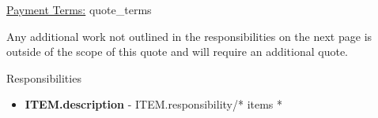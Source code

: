\documentclass{letter}
\begin{document}
\vspace{3 cm}

\underline{Payment Terms:} {{ quote_terms }}

\vspace{0.5 cm}

\small{Any additional work not outlined in the responsibilities on the next page is outside of the scope of this quote and will require an additional quote.}

\newpage

\Large{Responsibilities}

\begin{itemize}{* items *}
  \item \textbf{{{ITEM.description}}} - {{ITEM.responsibility}}{/* items *}
\end{itemize}
\end{document}
